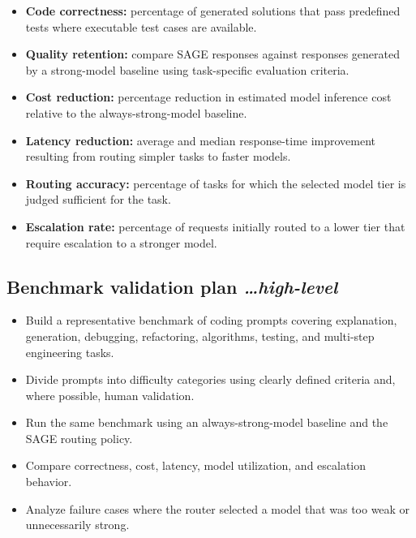 \documentclass[11pt,a4paper]{article}
\newcommand{\BvrHint}[1]{%
  {\normalfont\normalsize\itshape\hfill #1}%
}
\begin{document}
\begin{itemize}[leftmargin=0.7cm]

    \item \textbf{Code correctness:} percentage of generated
    solutions that pass predefined tests where executable
    test cases are available.

    \item \textbf{Quality retention:} compare SAGE responses
    against responses generated by a strong-model baseline
    using task-specific evaluation criteria.

    \item \textbf{Cost reduction:} percentage reduction in
    estimated model inference cost relative to the
    always-strong-model baseline.

    \item \textbf{Latency reduction:} average and median
    response-time improvement resulting from routing simpler
    tasks to faster models.

    \item \textbf{Routing accuracy:} percentage of tasks for
    which the selected model tier is judged sufficient for
    the task.

    \item \textbf{Escalation rate:} percentage of requests
    initially routed to a lower tier that require escalation
    to a stronger model.

\end{itemize}

\subsection{Benchmark validation plan%
  \texorpdfstring{\BvrHint{\ldots high-level}}{}}

\begin{itemize}[leftmargin=0.7cm]

    \item Build a representative benchmark of coding prompts
    covering explanation, generation, debugging, refactoring,
    algorithms, testing, and multi-step engineering tasks.

    \item Divide prompts into difficulty categories using
    clearly defined criteria and, where possible, human
    validation.

    \item Run the same benchmark using an always-strong-model
    baseline and the SAGE routing policy.

    \item Compare correctness, cost, latency, model
    utilization, and escalation behavior.

    \item Analyze failure cases where the router selected a
    model that was too weak or unnecessarily strong.

\end{itemize}
\end{document}
